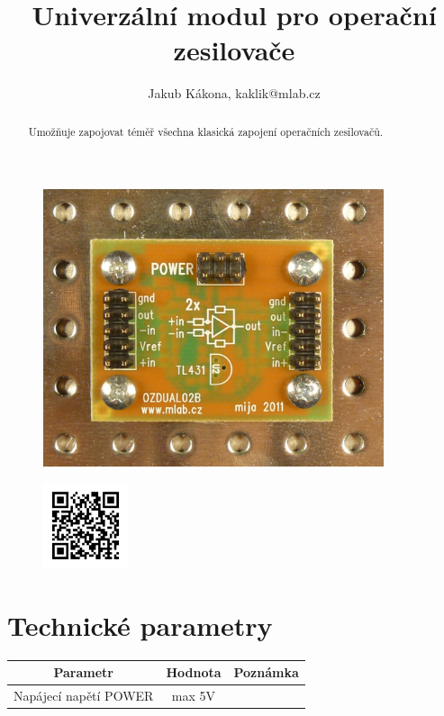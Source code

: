 \documentclass[12pt,a4paper,oneside]{article}
\begin{document}
\title{Univerzální modul pro operační zesilovače}
\author{Jakub Kákona, kaklik@mlab.cz}
\maketitle

\thispagestyle{empty}
\begin{abstract}
Umožňuje zapojovat téměř všechna klasická zapojení operačních zesilovačů. 
\end{abstract}

\begin{figure} [htbp]
\begin{center}
\includegraphics [width=100mm] {./img/OZDUAL02B_Top_Big.JPG} 
\end{center}
\end{figure}

\begin{figure} [b]
\includegraphics [width=25mm] {./img/OZDUAL02B_QRcode.png} 
\end{figure}

\newpage
\tableofcontents

\section{Technické parametry}
\begin{table}[htbp]
\begin{center}
\begin{tabular}{|c|c|p{4.7cm}|}
\hline
Parametr & Hodnota & Poznámka \\
\hline
Napájecí napětí POWER  & max 5V & \\ 
\hline
\end{tabular}
\end{center}
\end{table}
\end{document}

